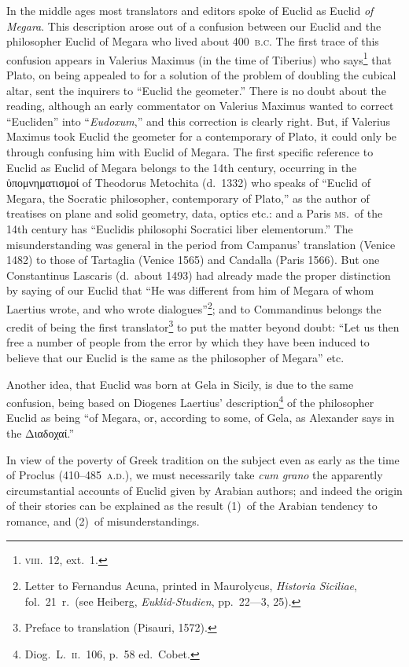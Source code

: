 In the middle ages most translators and editors spoke of Euclid as Euclid \emph{of Megara}. This description arose out of a confusion between our Euclid and the philosopher Euclid of Megara who lived about 400~\textsc{b.c.} The first trace of this confusion appears in Valerius Maximus (in the time of Tiberius) who says\footnote{\textsc{viii.}~12, ext.~1.} that Plato, on being appealed to for a solution of the problem of doubling the cubical altar, sent the inquirers to ``Euclid the geometer.'' There is no doubt about the reading, although an early commentator on Valerius Maximus wanted to correct ``Eucliden'' into ``\emph{Eudoxum},'' and this correction is clearly right. But, if Valerius Maximus took Euclid the geometer for a contemporary of Plato, it could only be through confusing him with Euclid of Megara. The first specific reference to Euclid as Euclid of Megara belongs to the 14th century, occurring in the ὑπομνηματισμοί of Theodorus Metochita (d.~1332) who speaks of ``Euclid of Megara, the Socratic philosopher, contemporary of Plato,'' as the author of treatises on plane and solid geometry, data, optics etc.: and a Paris \textsc{ms.}\ of the 14th century has ``Euclidis philosophi Socratici liber elementorum.'' The misunderstanding was general in the period from Campanus' translation (Venice 1482) to those of Tartaglia (Venice 1565) and Candalla (Paris 1566). But one Constantinus Lascaris (d.~about 1493) had already made the proper distinction by saying of our Euclid that ``He was different from him of Megara of whom Laertius wrote, and who wrote dialogues''\footnote{Letter to Fernandus Acuna, printed in Maurolycus, \emph{Historia Siciliae}, fol.~21~r.\ (see Heiberg, \emph{Euklid-Studien}, pp.~22---3, 25).}; and to Commandinus belongs the credit of being the first translator\footnote{Preface to translation (Pisauri, 1572).} to put the matter beyond doubt: ``Let us then free a number of people from the error by which they have been induced to believe that our Euclid is the same as the philosopher of Megara'' etc.

Another idea, that Euclid was born at Gela in Sicily, is due to the same confusion, being based on Diogenes Laertius' description\footnote{Diog.~L.~\textsc{ii}.~106, p.~58 ed.~Cobet.} of the philosopher Euclid as being ``of Megara, or, according to some, of Gela, as Alexander says in the Διαδοχαί.''

In view of the poverty of Greek tradition on the subject even as early as the time of Proclus (410--485~\textsc{a.d.}), we must necessarily take \emph{cum grano} the apparently circumstantial accounts of Euclid given by Arabian authors; and indeed the origin of their stories can be explained as the result (1)~of the Arabian tendency to romance, and (2)~of misunderstandings.

